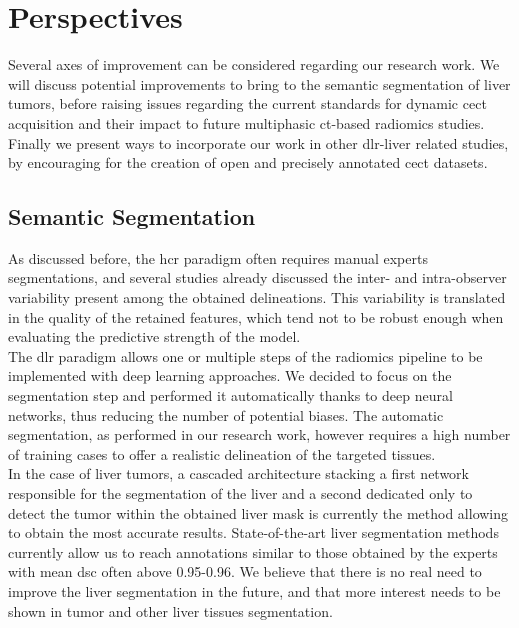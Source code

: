 \section{Perspectives}

Several axes of improvement can be considered regarding our research work.
We will discuss potential improvements to bring to the 
semantic segmentation of liver tumors, before raising issues regarding
the current standards for dynamic \ac{cect} acquisition and their impact to 
future multiphasic \ac{ct}-based radiomics studies.
Finally we present ways to incorporate our work in other \ac{dlr}-liver related 
studies, by encouraging for the creation of open and precisely 
annotated \ac{cect} datasets.

\subsection{Semantic Segmentation}

As discussed before, the \ac{hcr} paradigm often requires manual experts
segmentations, and several studies already discussed the inter- and
intra-observer variability present among the obtained delineations. This
variability is translated in the quality of the retained features, which
tend not to be robust enough when evaluating the predictive 
strength of the model.\\
The \ac{dlr} paradigm allows one or multiple steps of the radiomics pipeline to be implemented with deep learning approaches. We decided to focus on the segmentation step and performed it automatically thanks to deep neural networks, thus reducing the number of potential biases. The automatic segmentation, as
performed in our research work, however requires a high number of
training cases to offer a realistic delineation of the targeted tissues.\\
In the case of liver tumors, a cascaded architecture stacking a first
network responsible for the segmentation of the liver and a second
dedicated only to detect the tumor within the obtained liver mask is
currently the method allowing to obtain the most accurate results.
State-of-the-art liver segmentation methods currently allow us to reach
annotations similar to those obtained by the experts with mean \ac{dsc} often
above 0.95-0.96. We believe that there is no real need to improve the
liver segmentation in the future, and that more interest needs to be
shown in tumor and other liver tissues segmentation.

